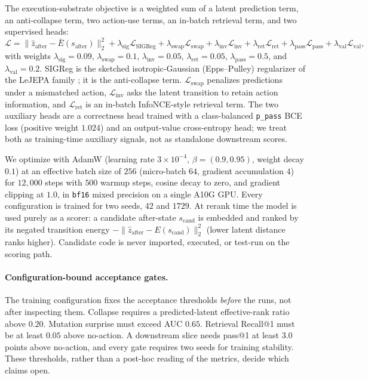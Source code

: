 \documentclass[11pt]{article}
\newcommand{\code}[1]{\texttt{#1}}
\begin{document}
The execution-substrate objective is a weighted sum of a latent prediction term,
an anti-collapse term, two action-use terms, an in-batch retrieval term, and two
supervised heads:
\begin{equation}
\label{eq:objective}
  \mathcal{L} =
  \big\|\hat z_{\mathrm{after}} - \bar E(s_{\mathrm{after}})\big\|_2^2
  + \lambda_{\mathrm{sig}}\mathcal{L}_{\mathrm{SIGReg}}
  + \lambda_{\mathrm{swap}}\mathcal{L}_{\mathrm{swap}}
  + \lambda_{\mathrm{inv}}\mathcal{L}_{\mathrm{inv}}
  + \lambda_{\mathrm{ret}}\mathcal{L}_{\mathrm{ret}}
  + \lambda_{\mathrm{pass}}\mathcal{L}_{\mathrm{pass}}
  + \lambda_{\mathrm{val}}\mathcal{L}_{\mathrm{val}},
\end{equation}
with weights $\lambda_{\mathrm{sig}}{=}0.09$, $\lambda_{\mathrm{swap}}{=}0.1$,
$\lambda_{\mathrm{inv}}{=}0.05$, $\lambda_{\mathrm{ret}}{=}0.05$,
$\lambda_{\mathrm{pass}}{=}0.5$, and $\lambda_{\mathrm{val}}{=}0.2$. SIGReg is the
sketched
isotropic-Gaussian (Epps--Pulley) regularizer of the LeJEPA family
\citep{balestriero2025lejepaprovablescalableselfsupervised,maes2026leworldmodelstableendtoendjointembedding};
it is the anti-collapse term. $\mathcal{L}_{\mathrm{swap}}$ penalizes predictions
under a mismatched action, $\mathcal{L}_{\mathrm{inv}}$ asks the latent transition
to retain action information, and $\mathcal{L}_{\mathrm{ret}}$ is an in-batch
InfoNCE-style retrieval term. The two auxiliary heads are a correctness head
trained with a class-balanced \code{p\_pass} BCE loss (positive weight $1.024$)
and an output-value cross-entropy head; we treat both as training-time auxiliary
signals, not as standalone downstream scores.

We optimize with AdamW (learning rate $3\times10^{-4}$, $\beta = (0.9, 0.95)$,
weight decay $0.1$) at an effective batch size of $256$ (micro-batch $64$,
gradient accumulation $4$) for $12{,}000$ steps with $500$ warmup steps, cosine
decay to zero, and gradient clipping at $1.0$, in \code{bf16} mixed precision on a
single A10G GPU. Every configuration is trained for two seeds, $42$ and $1729$.
At rerank time the model is used purely as a scorer: a candidate after-state
$s_{\mathrm{cand}}$ is embedded and ranked by its negated transition energy
$-\big\|\hat z_{\mathrm{after}} - E(s_{\mathrm{cand}})\big\|_2^2$ (lower latent
distance ranks higher). Candidate code is never imported, executed, or test-run
on the scoring path.

\paragraph{Configuration-bound acceptance gates.}
The training configuration fixes the acceptance thresholds \emph{before} the runs,
not after inspecting them. Collapse requires a predicted-latent effective-rank
ratio above $0.20$. Mutation surprise must exceed AUC $0.65$. Retrieval Recall@1
must be at least $0.05$ above no-action. A downstream slice needs pass@1 at least
$3.0$ points above no-action, and every gate requires two seeds for training
stability. These thresholds, rather than a post-hoc reading of the metrics,
decide which claims open.
\end{document}
